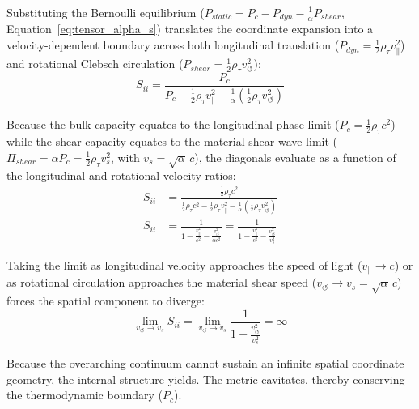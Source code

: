 Substituting the Bernoulli equilibrium ($P_{static} = P_c - P_{dyn} - \frac{1}{\alpha}P_{shear}$, Equation~\ref{eq:tensor_alpha_s}) translates the coordinate expansion into a velocity-dependent boundary across both longitudinal translation ($P_{dyn} = \frac{1}{2}\rho_\tau v_\parallel^2$) and rotational Clebsch circulation ($P_{shear} = \frac{1}{2}\rho_\tau v_\circlearrowleft^2$): %
\begin{equation}
    S_{ii} = \frac{P_c}{P_c - \frac{1}{2}\rho_\tau v_\parallel^2 - \frac{1}{\alpha}\left(\frac{1}{2}\rho_\tau v_\circlearrowleft^2\right)} %
\end{equation}

Because the bulk capacity equates to the longitudinal phase limit ($P_c = \frac{1}{2}\rho_\tau c^2$) while the shear capacity equates to the material shear wave limit ($\Pi_{shear} = \alpha P_c = \frac{1}{2}\rho_\tau v_s^2$, with $v_s = \sqrt{\alpha}\,c$), the diagonals evaluate as a function of the longitudinal and rotational velocity ratios: %
\begin{align}
    S_{ii} &= \frac{\frac{1}{2}\rho_\tau c^2}{\frac{1}{2}\rho_\tau c^2 - \frac{1}{2}\rho_\tau v_\parallel^2 - \frac{1}{\alpha}\left(\frac{1}{2}\rho_\tau v_\circlearrowleft^2\right)} \nonumber \\ %
    S_{ii} &= \frac{1}{1 - \frac{v_\parallel^2}{c^2} - \frac{v_\circlearrowleft^2}{\alpha c^2}} = \frac{1}{1 - \frac{v_\parallel^2}{c^2} - \frac{v_\circlearrowleft^2}{v_s^2}} \label{eq:spatial_diagonal_lorentz} %
\end{align}

Taking the limit as longitudinal velocity approaches the speed of light ($v_\parallel \to c$) or as rotational circulation approaches the material shear speed ($v_\circlearrowleft \to v_s = \sqrt{\alpha}\,c$) forces the spatial component to diverge: %
\begin{equation}
    \lim_{v_\circlearrowleft \to v_s} S_{ii} = \lim_{v_\circlearrowleft \to v_s} \frac{1}{1 - \frac{v_\circlearrowleft^2}{v_s^2}} = \infty \label{eq:tensor_divergence_limit} %
\end{equation}


Because the overarching continuum cannot sustain an infinite spatial coordinate geometry, the internal structure yields. The metric cavitates, thereby conserving the thermodynamic boundary ($P_c$). 

